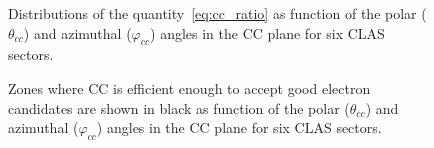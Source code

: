 \begin{figure}[htp]
\begin{center}
\caption{\small  Distributions of the quantity~\ref{eq:cc_ratio} as function of the polar ($\theta_{cc}$) and azimuthal ($\varphi_{cc}$) angles in the CC plane for six CLAS sectors.} \label{fig:ph_vs_th_cc}
\end{center}
\end{figure}

\begin{figure}[htp]
\begin{center}
\caption{\small  Zones where CC is efficient enough to accept good electron candidates are shown in black as function of the polar ($\theta_{cc}$) and azimuthal ($\varphi_{cc}$) angles in the CC plane for six CLAS sectors. } \label{fig:ph_vs_th_cc_08cut}
\end{center}
\end{figure}

